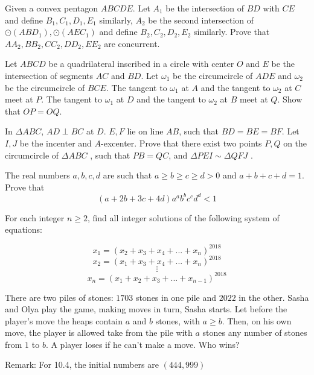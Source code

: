 \documentclass[11pt]{scrartcl}
\begin{document}
\begin{problem}[651308339506337942]
Given a convex pentagon $ ABCDE. $ Let $ A_1 $ be the intersection of $ BD $ with $ CE $ and define $ B_1, C_1, D_1, E_1 $ similarly, $ A_2 $ be the second intersection of $ \odot (ABD_1),\odot (AEC_1) $ and define $ B_2, C_2, D_2, E_2 $ similarly. Prove that $ AA_2, BB_2, CC_2, DD_2, EE_2 $ are concurrent.
\end{problem}
\begin{problem}[451078820354844]
	Let $ABCD$ be a quadrilateral inscribed in a circle with center $O$ and $E$ be the intersection of segments $AC$ and $BD$. Let $\omega_1$ be the circumcircle of $ADE$ and $\omega_2$ be the circumcircle of $BCE$. The tangent to $\omega_1$ at $A$ and the tangent to $\omega_2$ at $C$ meet at $P$. The tangent to $\omega_1$ at $D$ and the tangent to $\omega_2$ at $B$ meet at $Q$. Show that $OP=OQ$.
\end{problem}
\begin{problem}[8402748184217471405]
In $\Delta ABC$, $AD \perp BC$ at $D$. $E,F$ lie on line $AB$, such that $BD=BE=BF$. Let $I,J$ be the incenter and $A$-excenter. Prove that there exist two points $P,Q$ on the circumcircle of $\Delta ABC$ , such that $PB=QC$, and $\Delta PEI \sim \Delta QFJ$ .
\end{problem}
\begin{problem}[3813623497653179264]
	The real numbers $a, b, c, d$ are such that $a\geq b\geq c\geq d>0$ and $a+b+c+d=1$. Prove that
\[(a+2b+3c+4d)a^ab^bc^cd^d<1\]
\end{problem}
\begin{problem}[204202362084074]
	For each integer $n \ge 2$, find all integer solutions of the following system of equations:

\[x_1 = (x_2 + x_3 + x_4 + ... + x_n)^{2018}\]\[x_2 = (x_1 + x_3 + x_4 + ... + x_n)^{2018}\]\[\vdots\]\[x_n = (x_1 + x_2 + x_3 + ... + x_{n - 1})^{2018}\]
\end{problem}
\begin{problem}[15195306726194]
There are two piles of stones: $1703$ stones in one pile and $2022$ in the other. Sasha and Olya
play the game, making moves in turn, Sasha starts. Let before the player's move the heaps contain $a$ and $b$ stones, with $a \geq b$. Then, on his own move, the player is allowed take from the pile with $a$ stones any number of stones from $1$ to $b$. A player loses if he can't make a move. Who wins?

Remark: For 10.4, the initial numbers are $(444,999)$
\end{problem}
\end{document}
